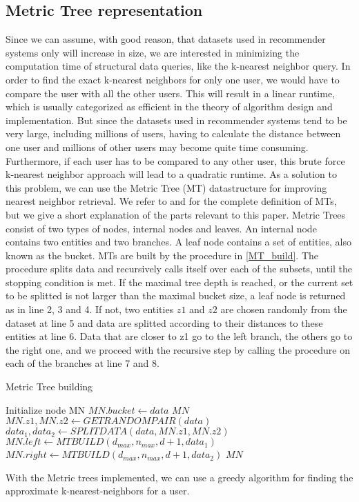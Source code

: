 \subsection{Metric Tree representation}
  Since we can assume, with good reason, that datasets used in recommender systems only will increase in size, we are interested in minimizing the computation time of structural data queries, like the k-nearest neighbor query. In order to find the exact k-nearest neighbors for only one user, we would have to compare the user with all the other users. This will result in a linear runtime, which is usually categorized as efficient in the theory of algorithm design and implementation. But since the datasets used in recommender systems tend to be very large, including millions of users, having to calculate the distance between one user and millions of other users may become quite time consuming. Furthermore, if each user has to be compared to any other user, this brute force k-nearest neighbor approach will lead to a quadratic runtime. As a solution to this problem, we can use the Metric Tree (MT) datastructure for improving nearest neighbor retrieval. We refer to \cite{jaeger2019counts} and \cite{uhlmann1991} for the complete definition of MTs, but we give a short explanation of the parts relevant to this paper.
  Metric Trees consist of two types of nodes, internal nodes and leaves. An internal node contains two entities and two branches. A leaf node contains a set of entities, also known as the bucket. MTs are built by the procedure in \autoref{MT_build}.  The procedure splits data and recursively calls itself over each of the subsets, until the stopping condition is met. If the maximal tree depth is reached, or the current set to be splitted is not larger than the maximal bucket size, a leaf node is returned as in line 2, 3 and 4. If not, two entities $z1$ and $z2$ are chosen randomly from the dataset at line 5 and data are splitted according to their distances to these entities at line 6. Data that are closer to z1 go to the left branch, the others go to the right one, and we proceed with the recursive step by calling the procedure on each of the branches at line 7 and 8.

  \begin{algorithm}
    \caption{Metric Tree building}\label{MT_build}
    \begin{algorithmic}[1]
      Initialize node MN
      \State $MN.bucket \gets data$
      \State \Return $MN$
      \EndIf
      \State $MN.z1, MN.z2 \gets GETRANDOMPAIR(data)$
      \State $data_1, data_2 \gets SPLITDATA(data, MN.z1, MN.z2)$
      \State $MN.left \gets MTBUILD(d_{max}, n_{max}, d+1, data_1)$
      \State $MN.right \gets MTBUILD(d_{max}, n_{max}, d+1, data_2)$
      \State \Return $MN$
    \EndProcedure
    \end{algorithmic}
\end{algorithm}

With the Metric trees implemented, we can use a greedy algorithm for finding the approximate k-nearest-neighbors for a user.
